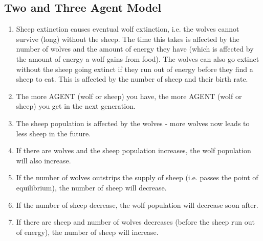 \documentclass{article}
\begin{document}
\subsection{Two and Three Agent Model}
\begin{enumerate}
  \item Sheep extinction causes eventual wolf extinction, i.e. the wolves cannot survive (long) without the sheep. The time this takes is affected by the number of wolves and the amount of energy they have (which is affected by the amount of energy a wolf gains from food). The wolves can also go extinct without the sheep going extinct if they run out of energy before they find a sheep to eat. This is affected by the number of sheep and their birth rate.
  \item The more AGENT (wolf or sheep) you have, the more AGENT (wolf or sheep) you get in the next generation.
  \item The sheep population is affected by the wolves - more wolves now leads to less sheep in the future.
  \item If there are wolves and the sheep population increases, the wolf population will also increase.
  \item If the number of wolves outstrips the supply of sheep (i.e. passes the point of equilibrium), the number of sheep will decrease.
  \item If the number of sheep decrease, the wolf population will decrease soon after.
  \item If there are sheep and number of wolves decreases (before the sheep run out of energy), the number of sheep will increase.
\end{enumerate}
\end{document}
